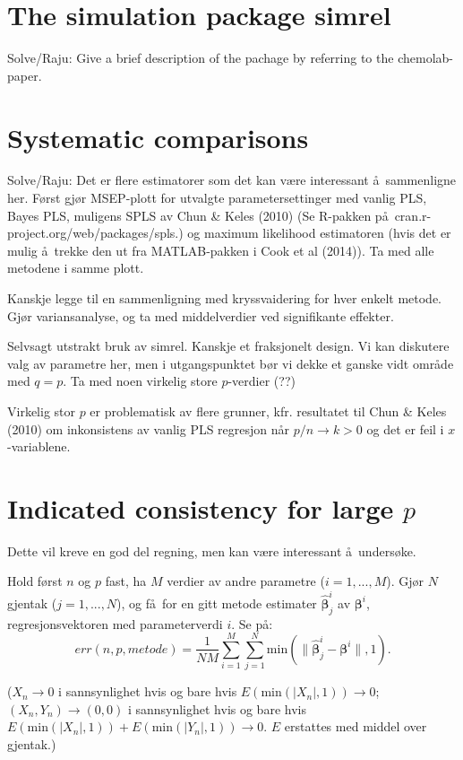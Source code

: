 \documentclass[11pt]{article}
\begin{document}
\section{The simulation package simrel}

Solve/Raju: Give a brief description of the pachage by referring to the chemolab-paper.

\section{Systematic comparisons}

Solve/Raju: Det er flere estimatorer som det kan v\ae re interessant \aa\ sammenligne her. F\o rst gj\o r MSEP-plott for utvalgte parametersettinger med vanlig PLS, Bayes PLS, muligens SPLS av Chun \& Keles (2010)  (Se R-pakken p\aa\ cran.r-project.org/web/packages/spls.) og maximum likelihood estimatoren (hvis det er mulig \aa\ trekke den ut fra MATLAB-pakken i Cook et al (2014)). Ta med alle metodene i samme plott. 

Kanskje legge til en sammenligning med kryssvaidering for hver enkelt metode. Gj\o r variansanalyse, og ta med middelverdier ved signifikante effekter.

Selvsagt utstrakt bruk av simrel. Kanskje et fraksjonelt design. Vi kan diskutere valg av parametre her, men i utgangspunktet b\o r vi dekke et ganske vidt omr\aa de med $q=p$. Ta med noen virkelig store $p$-verdier (??)  

Virkelig stor $p$ er problematisk av flere grunner, kfr. resultatet til Chun \& Keles (2010) om inkonsistens av vanlig PLS regresjon når $p/n\rightarrow k>0$ og det er feil i $x$-variablene. 

\section{Indicated consistency for large $p$}

Dette vil kreve en god del regning, men kan v\ae re interessant \aa\ unders\o ke.

Hold f\o rst $n$ og $p$ fast, ha $M$ verdier av andre parametre ($i=1,...,M$). Gj\o r $N$ gjentak ($j=1,...,N$), og f\aa\ for en gitt metode estimater $\widehat{\bm{\beta}}_j^i$ av $\bm{\beta}^i$, regresjonsvektoren med parameterverdi $i$. Se  p\aa :
\[err(n,p,metode)=\frac{1}{NM}\sum_{i=1}^M\sum_{j=1}^N \mathrm{min}(\|\widehat{\bm{\beta}}_j^i -\bm{\beta}^i \|,1).\]

($X_n\rightarrow 0$ i sannsynlighet hvis og bare hvis $E(\mathrm{min}(|X_n|,1))\rightarrow 0$; $(X_n,Y_n)\rightarrow (0,0)$ i sannsynlighet hvis og bare hvis $E(\mathrm{min}(|X_n|,1))+E(\mathrm{min}(|Y_n|,1))\rightarrow 0$. $E$ erstattes med middel over gjentak.)
\end{document}

